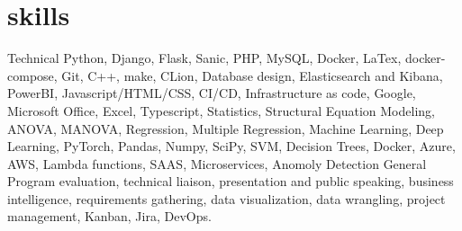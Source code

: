 \documentclass[]{twentysecondcv}
\begin{document}
\section{skills}
	\begin{twentyshort}
	\twentyitemshort
	{Technical}
	{Python, Django, Flask, Sanic, PHP, MySQL, Docker, LaTex, docker-compose, Git, C++, make, CLion, Database design, Elasticsearch and Kibana, PowerBI, Javascript/HTML/CSS, CI/CD, Infrastructure as code, Google, Microsoft Office, Excel, Typescript, Statistics, Structural Equation Modeling, ANOVA, MANOVA, Regression, Multiple Regression, Machine Learning, Deep Learning, PyTorch, Pandas, Numpy, SciPy, SVM, Decision Trees, Docker, Azure, AWS, Lambda functions, SAAS, Microservices, Anomoly Detection}
	\twentyitemshort
	{General}
	{Program evaluation, technical liaison, presentation and public speaking, business intelligence, requirements gathering, data visualization, data wrangling, project management, Kanban, Jira, DevOps.}
	\end{twentyshort}

\end{document}
